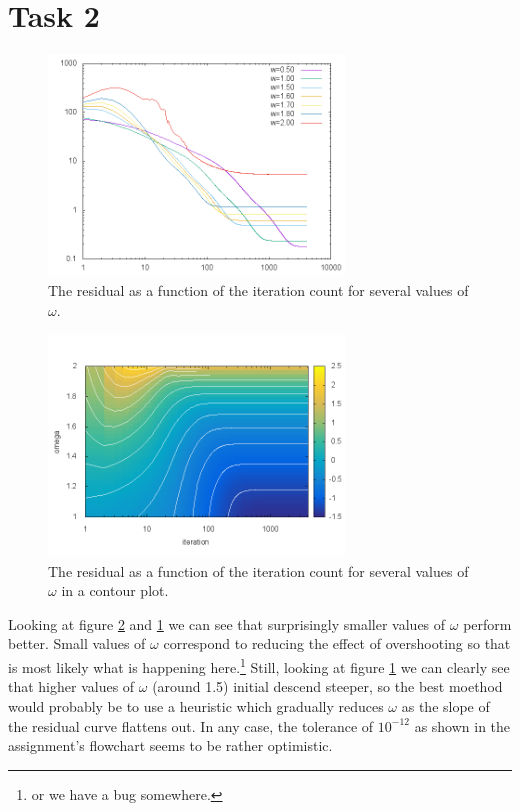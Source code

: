 \section{Task 2}
\begin{figure}[h!]
  \centering
    \includegraphics[width=0.7\textwidth]{plots/varying_omega.png}
  \caption{The residual as a function of the iteration count for several values of $\omega$.}
  \label{fig:varying_omega}
\end{figure}

\begin{figure}[h!]
  \centering
    \includegraphics[width=0.7\textwidth]{plots/omega_field.png}
  \caption{The residual as a function of the iteration count for several values of $\omega$ in a contour plot.}
  \label{fig:omega_field}
\end{figure}

 Looking at figure \ref{fig:omega_field} and \ref{fig:varying_omega} we can see that surprisingly smaller values of $\omega$ perform better.
 Small values of $\omega$ correspond to reducing the effect of overshooting so that is most likely what is happening here.\footnote{or we have a bug somewhere.}
 Still, looking at figure \ref{fig:varying_omega} we can clearly see that higher values of $\omega$ (around 1.5) initial descend steeper, so the best moethod would probably be to
 use a heuristic which gradually reduces $\omega$ as the slope of the residual curve flattens out. In any case, the tolerance of $10^{-12}$ as shown in the assignment's flowchart seems to be
 rather optimistic.

